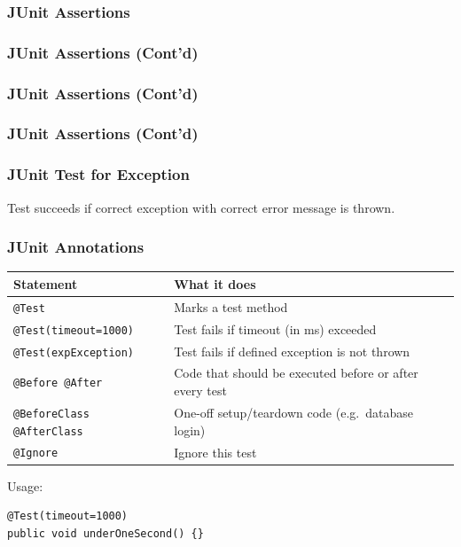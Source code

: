 \documentclass{beamer}
\def\mcolor#1#2{\rule{0ex}{0ex}\color{#1}#2\color{black}{}}
\begin{document}
\begin{frame}\footnotesize
\frametitle{JUnit Assertions}

\end{frame}

\begin{frame}\renewcommand{\baselinestretch}{0.85}\small
\frametitle{JUnit Assertions (Cont'd)}

\end{frame}

\begin{frame}\small
\frametitle{JUnit Assertions (Cont'd)}

\end{frame}

\begin{frame}\small
\frametitle{JUnit Assertions (Cont'd)}

\end{frame}

\begin{frame}\renewcommand{\baselinestretch}{0.7}\small
\frametitle{JUnit Test for Exception}


\mcolor{blue}{Test succeeds if correct exception with correct error
  message is thrown.}
\end{frame}

\begin{frame}[fragile]
\frametitle{JUnit Annotations}
\label{sec-25}


\begin{center}
\begin{tabular}{p{}p{}}
 Statement                                                    &  What it does                                             \\
\hline
\small\verb|@Test|                                            &  Marks a test method                                      \\
\small\verb|@Test(timeout=1000)|                              &  Test fails if timeout (in ms) exceeded         \\
\small\verb|@Test(expException)|  &  Test fails if defined exception is not thrown            \\
\small\verb|@Before @After|                                   &  Code that should be executed before or after every test  \\
\small\verb|@BeforeClass @AfterClass|                         &  One-off setup/teardown code (e.g.\ database login)         \\
\small\verb|@Ignore|                                          &  Ignore this test                                         \\
\end{tabular}
\end{center}


Usage:
\begin{verbatim}
@Test(timeout=1000)
public void underOneSecond() {}
\end{verbatim}
\end{frame}
\end{document}

